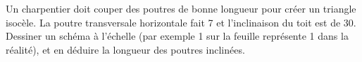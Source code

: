 
\begin{exercice}\label{exosmath-0779}

    Un charpentier doit couper des poutres de bonne longueur pour créer un triangle isocèle. La poutre transversale horizontale fait \unit{7}{\meter} et l'inclinaison du toit est de \unit{30}{\degree}. Dessiner un schéma à l'échelle (par exemple \unit{1}{\centi\meter} sur la feuille représente \unit{1}{\meter} dans la réalité), et en déduire la longueur des poutres inclinées.

\end{exercice}
